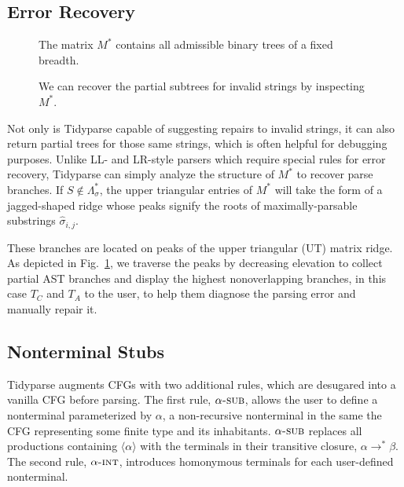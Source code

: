 \documentclass[sigplan,review,anonymous,acmsmall]{acmart}\settopmatter{printfolios=false,printccs=false,printacmref=false}
\begin{document}
\subsection{Error Recovery}\label{sec:error}

\begin{figure}
  \vspace{-20pt}
  \resizebox{0.4\textwidth}{!}{}
  \caption{The matrix $M^*$ contains all admissible binary trees of a fixed breadth.}\label{fig:binary_trees}
  \begin{center}
  \resizebox{.35\textwidth}{!}{}
  \end{center}
  \caption{We can recover the partial subtrees for invalid strings by inspecting $M^*$.}\label{fig:peaks}
\end{figure}

Not only is Tidyparse capable of suggesting repairs to invalid strings, it can also return partial trees for those same strings, which is often helpful for debugging purposes. Unlike LL- and LR-style parsers which require special rules for error recovery, Tidyparse can simply analyze the structure of $M^*$ to recover parse branches. If $S \notin  \Lambda^*_\sigma$, the upper triangular entries of $M^*$ will take the form of a jagged-shaped ridge whose peaks signify the roots of maximally-parsable substrings $\hat{\sigma}_{i, j}$.

These branches are located on peaks of the upper triangular (UT) matrix ridge. As depicted in Fig.~\ref{fig:peaks}, we traverse the peaks by decreasing elevation to collect partial AST branches and display the highest nonoverlapping branches, in this case $T_C$ and $T_A$ to the user, to help them diagnose the parsing error and manually repair it.

\subsection{Nonterminal Stubs}

Tidyparse augments CFGs with two additional rules, which are desugared into a vanilla CFG before parsing. The first rule, $\alpha\textsc{-sub}$, allows the user to define a nonterminal parameterized by $\alpha$, a non-recursive nonterminal in the same the CFG representing some finite type and its inhabitants. $\alpha\textsc{-sub}$ replaces all productions containing $\langle\alpha\rangle$ with the terminals in their transitive closure, $\alpha \rightarrow^* \beta$. The second rule, $\alpha\textsc{-int}$, introduces homonymous terminals for each user-defined nonterminal.
\end{document}

